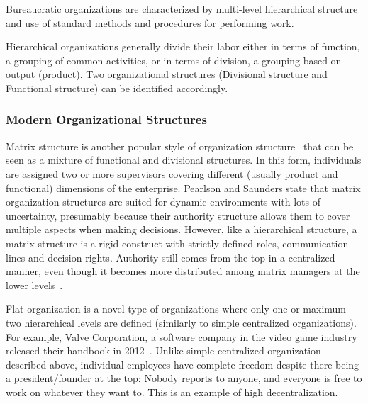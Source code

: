 Bureaucratic organizations \cite{mintzberg1981} are characterized by multi-level hierarchical structure and use of standard methods and procedures for performing work. 

Hierarchical organizations generally divide their labor either in terms of function, a grouping of common activities, or in terms of division, a grouping based on output (product). Two  organizational structures (Divisional structure and Functional structure) can be identified accordingly.

\subsubsection{Modern Organizational Structures}

Matrix structure is another popular style of organization structure~\cite{pearlson2009} that can be seen as a mixture of functional and divisional structures. In this form, individuals are assigned two or more supervisors covering different (usually product and functional) dimensions of the enterprise. Pearlson and Saunders state that matrix organization structures are suited for dynamic environments with lots of uncertainty, presumably because their authority structure allows them to cover multiple aspects when making decisions. However, like a hierarchical structure, a matrix structure is a rigid construct with strictly defined roles, communication lines and decision rights. Authority still comes from the top in a centralized manner, even though it becomes more distributed among matrix managers at the lower levels~\cite{pearlson2009}. 


Flat organization is a novel type of organizations where only one or maximum two hierarchical levels are defined (similarly to simple centralized organizations). For example, Valve Corporation, a software company in the video game industry released their handbook in 2012~\cite{valveHandbook}.  Unlike simple centralized organization described above, individual employees have complete freedom despite there being a president/founder at the top: Nobody reports to anyone, and everyone is free to work on whatever they want to. This is an example of high decentralization.


